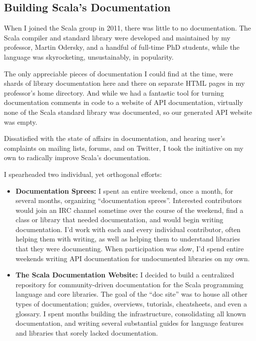 \documentclass[acmtocl]{acmtrans2m}
\begin{document}
\vspace{-0.1in}
\subsection*{\textbf{Building Scala's Documentation}}
\vspace{-0.1in}

When I joined the Scala group in 2011, there was little to no documentation.
The Scala compiler and standard library were developed and maintained by my
professor, Martin Odersky, and a handful of full-time PhD students, while the
language was skyrocketing, unsustainably, in popularity.

The only appreciable pieces of documentation I could find at the time, were
shards of library documentation here and there on separate HTML pages in my
professor's home directory. And while we had a fantastic tool for turning
documentation comments in code to a website of API documentation, virtually
none of the Scala standard library was documented, so our generated API
website was empty.

Dissatisfied with the state of affairs in documentation, and hearing user's
complaints on mailing lists, forums, and on Twitter, I took the initiative on
my own to radically improve Scala's documentation.

I spearheaded two individual, yet orthogonal efforts:

\vspace{-0.1in}
\begin{itemize}
\item \textbf{\textsf{Documentation Sprees:}} I spent an entire weekend, once a month, for several months, organizing ``documentation sprees''. Interested contributors would join an IRC channel sometime over the course of the weekend, find a class or library that needed documentation, and would begin writing documentation. I'd work with each and every individual contributor, often helping them with writing, as well as helping them to understand libraries that they were documenting. When participation was slow, I'd spend entire weekends writing API documentation for undocumented libraries on my own.

\item \textbf{\textsf{The Scala Documentation Website:}} I decided to build a centralized repository for community-driven documentation for the Scala programming language and core libraries. The goal of the ``doc site'' was to house all other types of documentation; guides, overviews, tutorials, cheatsheets, and even a glossary. I spent months building the infrastructure, consolidating all known documentation, and writing several substantial guides for language features and libraries that sorely lacked documentation.
\end{itemize}
\vspace{-0.1in}
\end{document}
